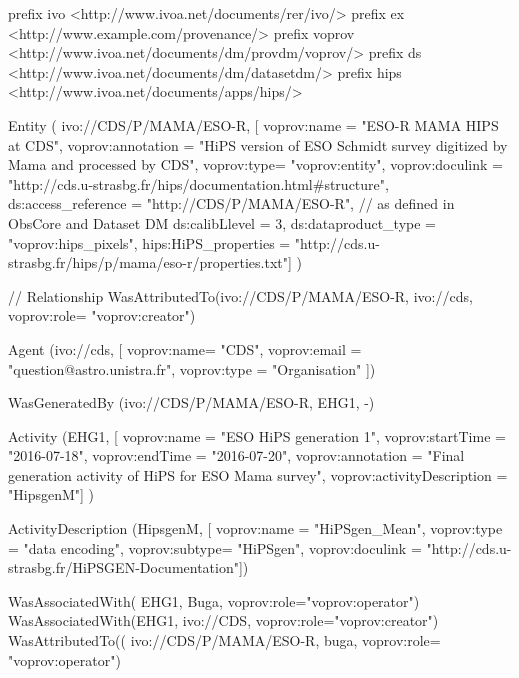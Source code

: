 \begin{verbnobox}[\scriptsize]
prefix ivo <http://www.ivoa.net/documents/rer/ivo/>
prefix ex <http://www.example.com/provenance/>
prefix voprov <http://www.ivoa.net/documents/dm/provdm/voprov/>
prefix ds <http://www.ivoa.net/documents/dm/datasetdm/>
prefix hips <http://www.ivoa.net/documents/apps/hips/>

Entity
( ivo://CDS/P/MAMA/ESO-R, 
[ voprov:name = "ESO-R MAMA HIPS at CDS",
voprov:annotation = "HiPS version of ESO Schmidt survey digitized by Mama and processed by CDS",
voprov:type= "voprov:entity",
voprov:doculink = "http://cds.u-strasbg.fr/hips/documentation.html#structure",
ds:access_reference = "http://CDS/P/MAMA/ESO-R", // as defined in ObsCore and Dataset DM
ds:calibLlevel = 3,
ds:dataproduct_type = "voprov:hips_pixels",
hips:HiPS_properties = "http://cds.u-strasbg.fr/hips/p/mama/eso-r/properties.txt"] )

// Relationship
WasAttributedTo(ivo://CDS/P/MAMA/ESO-R, ivo://cds, voprov:role= "voprov:creator")

Agent
(ivo://cds,
[ voprov:name= "CDS",
voprov:email = "question@astro.unistra.fr",
voprov:type = "Organisation" ]) 

WasGeneratedBy  (ivo://CDS/P/MAMA/ESO-R, EHG1, -) 

Activity
(EHG1,
[ voprov:name = "ESO HiPS generation 1",
voprov:startTime = "2016-07-18", 
voprov:endTime = "2016-07-20",
voprov:annotation = "Final generation activity of HiPS for ESO Mama survey",
voprov:activityDescription = "HipsgenM"] )
 
ActivityDescription 
(HipsgenM,
[ voprov:name = "HiPSgen_Mean",
voprov:type = "data encoding",
voprov:subtype= "HiPSgen",
voprov:doculink = "http://cds.u-strasbg.fr/HiPSGEN-Documentation"])

WasAssociatedWith( EHG1, Buga, voprov:role="voprov:operator")
WasAssociatedWith(EHG1, ivo://CDS, voprov:role="voprov:creator")
WasAttributedTo(( ivo://CDS/P/MAMA/ESO-R, buga, voprov:role= "voprov:operator")
\end{verbnobox}
